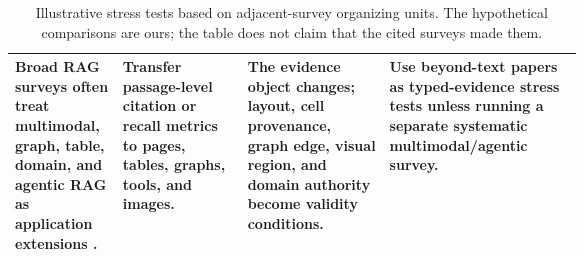 \begin{table}[t]
\begin{tabularx}{\linewidth}{>{\raggedright\arraybackslash}p{0.19\linewidth}>{\raggedright\arraybackslash}p{0.22\linewidth}>{\raggedright\arraybackslash}p{0.25\linewidth}X}
Broad RAG surveys often treat multimodal, graph, table, domain, and agentic RAG as application extensions \citep{ragSurvey2024,ragComprehensive2025}. & Transfer passage-level citation or recall metrics to pages, tables, graphs, tools, and images. & The evidence object changes; layout, cell provenance, graph edge, visual region, and domain authority become validity conditions. & Use beyond-text papers as typed-evidence stress tests unless running a separate systematic multimodal/agentic survey. \\
\bottomrule
\end{tabularx}
\caption{Illustrative stress tests based on adjacent-survey organizing units. The hypothetical comparisons are ours; the table does not claim that the cited surveys made them.}
\label{tab:main-prior-survey-error-cases}
\end{table}
